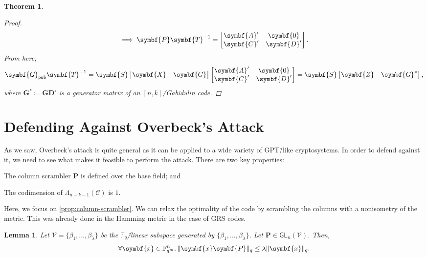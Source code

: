 \documentclass[version=last, paper=A4, parskip=half, oneside,%
toc=bibliography, toc=listof, listof=leveldown]{scrbook}
\theoremstyle{plain}
\newtheorem{theorem}{Theorem}
\newtheorem{lemma}{Lemma}
\theoremstyle{definition}
\theoremstyle{remark}
\renewcommand*{\vec}{\symbf}
\newcommand*{\mat}{\symbf}
\newcommand*{\GL}{\ensuremath{\mathsf{GL}}}
\newcommand*{\pub}{\ensuremath{\mathsf{pub}}}
\newcommand*{\FF}{\ensuremath{\mathbb{F}}}
\DeclarePairedDelimiter{\norm}{\lVert}{\rVert}
\newcommand*{\normR}[2]{\ensuremath{\norm{#1}_{#2}}}
\begin{document}
\begin{theorem}
\begin{proof}
\[      \implies
      \mat{P} \mat{T}^{-1} =
      \begin{bmatrix} \mat{A}' & \mat{0} \\ \mat{C}' & \mat{D}' \end{bmatrix}\text.
    \]
    From here,
    \[
      \mat{G}_{\pub} \mat{T}^{-1} =
      \mat{S}
      \begin{bmatrix} \mat{X} & \mat{G} \end{bmatrix}
      \begin{bmatrix} \mat{A}' & \mat{0} \\ \mat{C}' & \mat{D}' \end{bmatrix} =
      \mat{S}
      \begin{bmatrix} \mat{Z} & \mat{G}^* \end{bmatrix}\text,
    \]
    where \(\mat{G}^* \coloneqq \mat{G} \mat{D}'\) is a generator matrix of an
    \([n, k]\)\=/Gabidulin code.
  \end{proof}
\end{theorem}

\section{Defending Against Overbeck's Attack}

As we saw, Overbeck's attack is quite general as it can be applied to a wide
variety of GPT\=/like cryptosystems.  In order to defend against it, we need to
see what makes it feasible to perform the attack.  There are two key properties:
\begin{properties}
\item\label{prop:column-scrambler} The column scrambler \(\mat{P}\) is defined
  over the base field; and
\item\label{prop:codimension} The codimension of
  \(\Lambda_{n - k - 1}(\mathcal{C})\) is \(1\).
\end{properties}
Here, we focus on \cref{prop:column-scrambler}.  We can relax the optimality of
the code by scrambling the columns with a nonisometry of the metric.  This was
already done in the Hamming metric in the case of GRS codes.

\begin{lemma}\label{lem:rank-multiplication}
  Let \(\mathcal{V} = \{\beta_1, \ldots, \beta_{\lambda}\}\) be the
  \(\FF_q\)\=/linear subspace generated by
  \(\{\beta_1, \ldots, \beta_{\lambda}\}\).  Let
  \(\mat{P} \in \GL_n(\mathcal{V})\).  Then,
  \[
    \forall \vec{x} \in \FF_{q^m}^n\ldotp
    \normR{\vec{x} \mat{P}}{q} \le \lambda \normR{\vec{x}}{q}\text.
  \]
\end{lemma}
\end{document}
